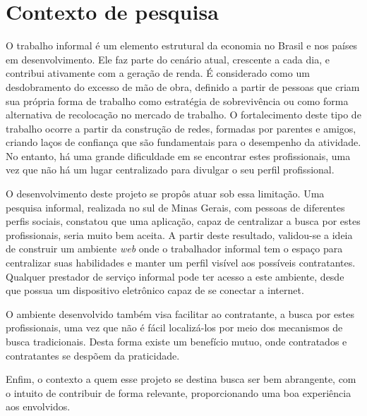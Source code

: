 \section{Contexto de pesquisa}
\par O trabalho informal é um elemento estrutural da economia no Brasil e nos países em desenvolvimento. Ele faz parte do cenário atual, crescente a cada dia, e contribui ativamente com a geração de renda. É considerado como um desdobramento do excesso de mão de obra, definido a partir de pessoas que criam sua própria forma de trabalho como estratégia de sobrevivência ou como forma alternativa de recolocação no mercado de trabalho. O fortalecimento deste tipo de trabalho ocorre a partir da construção de redes, formadas por parentes e amigos, criando laços de confiança que são fundamentais para o desempenho da atividade. No entanto, há uma grande dificuldade em se encontrar estes profissionais, uma vez que não há um lugar centralizado para divulgar o seu perfil profissional.

\par O desenvolvimento deste projeto se propôs atuar sob essa limitação. Uma pesquisa informal, realizada no sul de Minas Gerais, com pessoas de diferentes perfis sociais, constatou que uma aplicação, capaz de centralizar a busca por estes profissionais, seria muito bem aceita. A partir deste resultado, validou-se a ideia de construir um ambiente \textit{web} onde o trabalhador informal tem o espaço para centralizar suas habilidades e manter um perfil visível aos possíveis contratantes. Qualquer prestador de serviço informal pode ter acesso a este ambiente, desde que possua um dispositivo eletrônico capaz de se conectar a internet. 

\par O ambiente desenvolvido também visa facilitar ao contratante, a busca por estes profissionais, uma vez que não é fácil localizá-los por meio dos mecanismos de busca tradicionais. Desta forma existe um benefício mutuo, onde contratados e contratantes se despõem da praticidade.

\par Enfim, o contexto a quem esse projeto se destina busca ser bem abrangente, com o intuito de contribuir de forma relevante, proporcionando uma boa experiência aos envolvidos.
 

